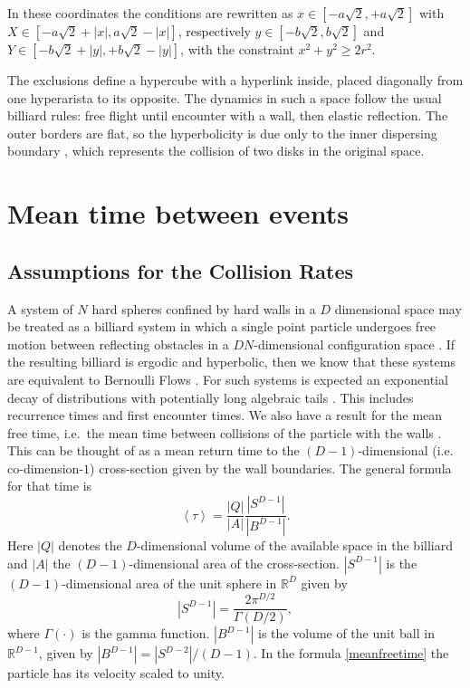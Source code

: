 \documentclass[a4paper,10pt, jcp, aps, preprint]{revtex4-1}
\newcommand{\mean}[1]{\left \langle #1 \right \rangle}
\newcommand{\RR}{\mathbb{R}}
\begin{document}
In these coordinates the conditions are rewritten as
$x \in [-a \sqrt{2}, +a \sqrt{2}]$ with 
$X \in [-a \sqrt{2} + |x|, a \sqrt{2} - |x|]$, respectively 
 $y \in [-b \sqrt{2}, b \sqrt{2}]$ and $Y \in [-b \sqrt{2} + |y|, +b \sqrt{2} - |y|]$,  
with the constraint $x^2 + y^2 \ge 2 r^2$.

The exclusions define a hypercube with a hyperlink inside, placed diagonally 
from one hyperarista to its opposite. 
The dynamics in such a space follow
the usual billiard rules: free flight until
encounter with a wall, then elastic reflection.
The outer borders are flat, so the
hyperbolicity is due only to the inner dispersing
boundary \cite{Sim99}, which represents the collision of
two disks in the original space.


\section{Mean time between events}


\subsection{Assumptions for the Collision Rates}

A system of $N$ hard spheres confined by hard walls in a $D$ dimensional
space may be treated as a billiard system 
in which a single point  particle undergoes free motion between reflecting obstacles 
in a $ D N $-dimensional configuration space \cite{Sinai70, MarkChern}. 
If the resulting billiard is ergodic and hyperbolic, then we know that
these systems are equivalent to Bernoulli Flows \cite{Gallavotti74}.
For such systems is expected an exponential decay of 
distributions \cite{AbadiGalves} with potentially
long algebraic tails \cite{ZasTip}. 
This includes recurrence times and
first encounter times. We also
have a result for the mean free time, i.e.\ the mean time between 
collisions of the particle with the walls \cite{MarkChern}. 
This can be thought of as a mean return time to the $(D-1)$-dimensional 
(i.e. co-dimension-$1$) cross-section given by the wall boundaries.
The general formula for that time is
\begin{equation}\label{meanfreetime}
 \mean{\tau} = \frac{|Q|}{|A|} \frac{|S^{D-1}|}{|B^{D-1}|}.
\end{equation}
Here $|Q|$ denotes the $D$-dimensional volume of the available 
space in the billiard and 
$|A|$ the $(D-1)$-dimensional area of the cross-section.
 $|S^{D-1}|$ is the $(D-1)$-dimensional area of the unit sphere in $\RR^D$ given by
\begin{equation}
  |S^{D-1}| = \frac{2 \pi^{D/2}}{\Gamma(D/2)},
\end{equation}
where $\Gamma(\cdot)$ is the gamma function. 
$|B^{D-1}|$ is the volume of the unit ball 
in $\RR^{D-1}$, given by $|B^{D-1}| = |S^{D-2}| / (D-1)$.
In the formula \ref{meanfreetime}  the particle has 
its velocity scaled to unity.
\end{document}
